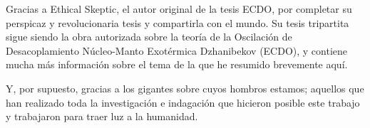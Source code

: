 \documentclass[10pt,twocolumn,letterpaper]{article}
\begin{document}
Gracias a Ethical Skeptic, el autor original de la tesis ECDO, por completar su perspicaz y revolucionaria tesis y compartirla con el mundo. Su tesis tripartita \cite{1} sigue siendo la obra autorizada sobre la teoría de la Oscilación de Desacoplamiento Núcleo-Manto Exotérmica Dzhanibekov (ECDO), y contiene mucha más información sobre el tema de la que he resumido brevemente aquí.

Y, por supuesto, gracias a los gigantes sobre cuyos hombros estamos; aquellos que han realizado toda la investigación e indagación que hicieron posible este trabajo y trabajaron para traer luz a la humanidad.
{\small
\renewcommand{\refname}{References}


}
\end{document}

